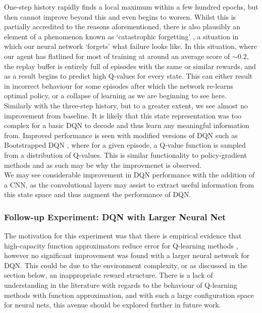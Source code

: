 \documentclass[12pt]{article}
\begin{document}
One-step history rapidly finds a local maximum within a few hundred epochs, but then cannot improve beyond this and even begins to worsen. Whilst this is partially accredited to the reasons aforementioned, there is also plausibly an element of a phenomenon known as `catastrophic forgetting' \autocite{FRENCH1999128}, a situation in which our neural network `forgets' what failure looks like. In this situation, where our agent has flatlined for most of training at around an average score of $\sim0.2$, the replay buffer is entirely full of episodes with the same or similar rewards, and as a result begins to predict high Q-values for every state. This can either result in incorrect behaviour for some episodes after which the network re-learns optimal policy, or a collapse of learning as we are beginning to see here. \\\newline
Similarly with the three-step history, but to a greater extent, we see almost no improvement from baseline. It is likely that this state representation was too complex for a basic DQN to decode and thus learn any meaningful information from. Improved performance is seen with modified versions of DQN such as Bootstrapped DQN \autocite{osband2016deep}, where for a given episode, a Q-value function is sampled from a distribution of Q-values. This is similar functionality to policy-gradient methods and as such may be why the improvmenet is observed.  \\\newline
We may see considerable improvement in DQN performance with the addition of a CNN, as the convolutional layers may assist to extract useful information from this state space and thus augment the performance of DQN.
\subsubsection{Follow-up Experiment: DQN with Larger Neural Net}\label{followupDQN}
The motivation for this experiment was that there is empirical evidence that high-capacity function approximators reduce error for Q-learning methods \autocite{pmlr-v97-fu19a}, however no significant improvement was found with a larger neural network for DQN. This could be due to the environment complexity, or as discussed in the section below, an inappropriate reward structure. There is a lack of understanding in the literature with regards to the behaviour of Q-learning methods with function approximation, and with such a large configuration space for neural nets, this avenue should be explored further in future work. 
\end{document}
